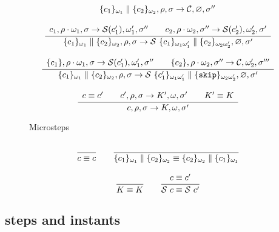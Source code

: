 \documentclass[12pt]{article}
\def\env{\rho}
\def\heap{\sigma}
\def\continue{{\mathcal{C}}}
\def\suspend{{\mathcal{S}}}
\def\skipp{{\tt{skip}}}
\begin{document}
\begin{figure}
$$\begin{array}{c}
{\begin{array}{c}
  \end{array}
  }{
    \{c_1\}_{\omega_1} \parallel \{c_2\}_{\omega_2}, \env ,\heap \rightarrow 
    \continue, \varnothing,\heap''
  }
  \\\\
  \cfrac{
  \begin{array}{c}
    c_1, \env \cdot \omega_1, \heap \rightarrow 
    \suspend(c_1') ,\omega_1' , \heap''
    \qquad
    c_2, \env \cdot \omega_2 , \heap'' \rightarrow 
    \suspend(c_2') ,\omega_2' ,\heap'
  \end{array}
  }{
  \{c_1\}_{\omega_1} \parallel \{c_2\}_{\omega_2}, \env ,\heap \rightarrow 
  \suspend~\{c_1\}_{\omega_1\omega_1'} \parallel \{c_2\}_{\omega_2\omega_2'}, \varnothing, \heap'
  }
  \\\\
  \cfrac{
  \begin{array}{c}
    \{c_1\}, \env \cdot \omega_1, \heap \rightarrow 
    \suspend(c_1') ,\omega_1' , \heap''
    \qquad 
    \{c_2\}, \env \cdot \omega_2 , \heap'' \rightarrow 
    \continue ,\omega_2' ,\heap'''
  \end{array}
  }{
  \{c_1\}_{\omega_1} \parallel \{c_2\}_{\omega_2}, \env ,\heap \rightarrow 
  \suspend~\{c_1'\}_{\omega_1\omega_1'} \parallel \{\skipp\}_{\omega_2\omega_2'}, \varnothing,\heap'
  }
  \\\\
  \cfrac{
  \begin{array}{c}
  c \equiv c' \qquad c',\env,\heap \rightarrow K',\omega,\heap' \qquad K' \equiv K
  \end{array}
  }{
  c, \env ,\heap \rightarrow 
  K,\omega,\heap'
  }
\end{array}
$$
\caption{Microsteps}
\label{fig:sem3}
\end{figure}
$$
\begin{array}{c}
  \cfrac{}{c \equiv c} \qquad 
  \cfrac{}
  {
    \{c_1\}_{\omega_1} \parallel \{c_2\}_{\omega_2} \equiv
    \{c_2\}_{\omega_2} \parallel \{c_1\}_{\omega_1} 
  }
  \\\\
  \cfrac{}{K \equiv K} \qquad
  \cfrac{c \equiv c'}{\suspend~c \equiv \suspend~c'}
\end{array}
$$

\def\kill{{\mathit{kill}}}
\def\collect{{\mathit{collect}}}
\newcommand{\addressOf}[1]{#1\lightning}

\def\suspended{{\mathit{suspended}}}
\def\unlock{{\mathit{unlock}}}

\subsection{steps and instants}
\end{document}
